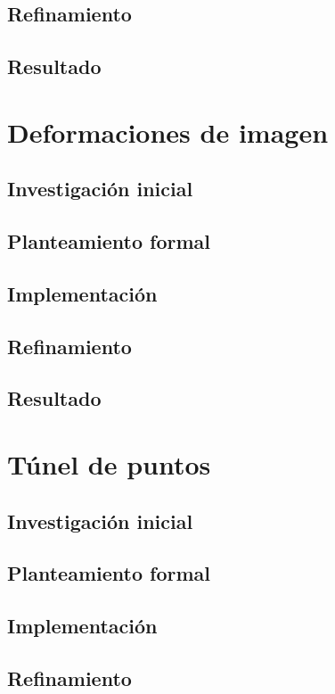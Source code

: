 \subsection{Refinamiento}
\subsection{Resultado}

\section{Deformaciones de imagen}

\subsection{Investigación inicial}
\subsection{Planteamiento formal}
\subsection{Implementación}
\subsection{Refinamiento}
\subsection{Resultado}

\section{Túnel de puntos}

\subsection{Investigación inicial}
\subsection{Planteamiento formal}
\subsection{Implementación}
\subsection{Refinamiento}

